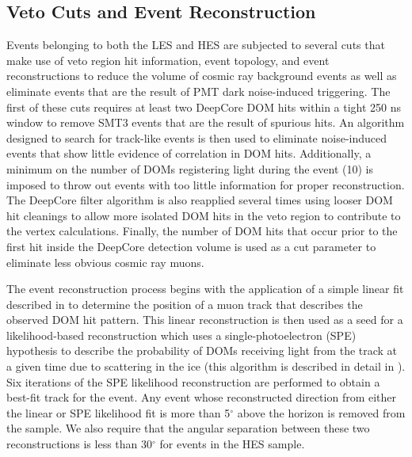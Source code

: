 \documentclass[manuscript]{aastex}
\begin{document}
\subsection{Veto Cuts and Event Reconstruction}
Events belonging to both the LES and HES are subjected to several cuts that make use of veto region hit information, event topology, and event reconstructions to reduce the volume of cosmic ray background events as well as eliminate events that are the result of PMT dark noise-induced triggering. The first of these cuts requires at least two DeepCore DOM hits within a tight 250 ns window to remove SMT3 events that are the result of spurious hits. An algorithm designed to search for track-like events is then used to eliminate noise-induced events that show little evidence of correlation in DOM hits. Additionally, a minimum on the number of DOMs registering light during the event (10) is imposed to throw out events with too little information for proper reconstruction. The DeepCore filter algorithm is also reapplied several times using looser DOM hit cleanings to allow more isolated DOM hits in the veto region to contribute to the vertex calculations. Finally, the number of DOM hits that occur prior to the first hit inside the DeepCore detection volume is used as a cut parameter to eliminate less obvious cosmic ray muons.

The event reconstruction process begins with the application of a simple linear fit described in \cite{2014NIMPA.736..143A} to determine the position of a muon track that describes the observed DOM hit pattern. This linear reconstruction is then used as a seed for a likelihood-based reconstruction which uses a single-photoelectron (SPE) hypothesis to describe the probability of DOMs receiving light from the track at a given time due to scattering in the ice (this algorithm is described in detail in \cite{2004NIMPA.524..169A}). Six iterations of the SPE likelihood reconstruction are performed to obtain a best-fit track for the event. Any event whose reconstructed direction from either the linear or SPE likelihood fit is more than 5$^{\circ}$ above the horizon is removed from the sample. We also require that the angular separation between these two reconstructions is less than 30$^{\circ}$ for events in the HES sample.
\end{document}
